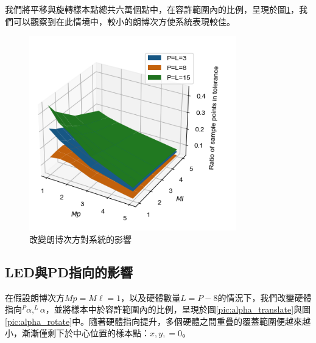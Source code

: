 我們將平移與旋轉樣本點總共六萬個點中，在容許範圍內的比例，呈現於圖\ref{pic:m_effect}，我們可以觀察到在此情境中，較小的朗博次方使系統表現較佳。

\begin{figure}[h!]
    \centering
    \includegraphics[width=9cm]{ch4pic/m_effect.png}
    \caption{改變朗博次方對系統的影響}
    \label{pic:m_effect}
\end{figure}



\subsection{LED與PD指向的影響}

在假設朗博次方$Mp=M\ell=1$，以及硬體數量$L=P-8$的情況下，我們改變硬體指向$^P\alpha,^L\alpha$，並將樣本中於容許範圍內的比例，呈現於圖\ref{pic:alpha_translate}與圖\ref{pic:alpha_rotate}中。隨著硬體指向提升，多個硬體之間重疊的覆蓋範圍便越來越小，漸漸僅剩下於中心位置的樣本點：$x,y,=0$。

